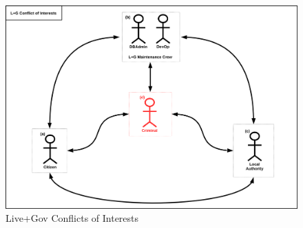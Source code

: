 \begin{figure}
\centering
\includegraphics[width=\textwidth]{diagrams/png/conflict-of-interests.png}
\caption{Live+Gov Conflicts of Interests}
\label{figure:Live+Gov Conflicts of Interests}
\end{figure}
